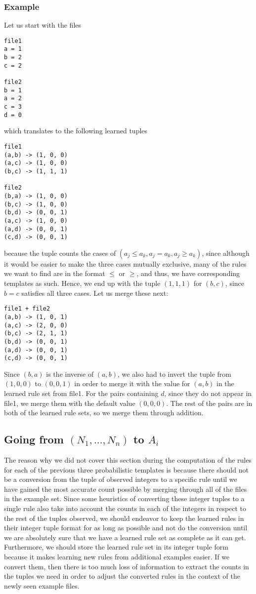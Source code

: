 \documentclass[12pt]{article}
\begin{document}
\subsubsection{Example}
Let us start with the files
\begin{lstlisting}
file1
a = 1
b = 2
c = 2

file2
b = 1
a = 2
c = 3
d = 0
\end{lstlisting}
which translates to the following learned tuples
\begin{lstlisting}
file1
(a,b) -> (1, 0, 0)
(a,c) -> (1, 0, 0)
(b,c) -> (1, 1, 1)

file2
(b,a) -> (1, 0, 0)
(b,c) -> (1, 0, 0)
(b,d) -> (0, 0, 1)
(a,c) -> (1, 0, 0)
(a,d) -> (0, 0, 1)
(c,d) -> (0, 0, 1)
\end{lstlisting}
because the tuple counts the cases of $(a_j \leq a_k, a_j = a_k, a_j \geq a_k)$, since although it would be easier to make the three cases mutually exclusive, many of the rules we want to find are in the format $\leq$ or $\geq$, and thus, we have corresponding templates as such. Hence, we end up with the tuple $(1, 1, 1)$ for $(b,c)$, since $b = c$ satisfies all three cases. Let us merge these next:
\begin{lstlisting}
file1 + file2
(a,b) -> (1, 0, 1)
(a,c) -> (2, 0, 0)
(b,c) -> (2, 1, 1)
(b,d) -> (0, 0, 1)
(a,d) -> (0, 0, 1)
(c,d) -> (0, 0, 1)
\end{lstlisting}
Since $(b,a)$ is the inverse of $(a,b)$, we also had to invert the tuple from $(1, 0, 0)$ to $(0, 0, 1)$ in order to merge it with the value for $(a,b)$ in the learned rule set from file1. For the pairs containing $d$, since they do not appear in file1, we merge them with the default value $(0, 0, 0)$. The rest of the pairs are in both of the learned rule sets, so we merge them through addition.

\subsection{Going from $(N_1, ... , N_n)$ to $A_i$}
The reason why we did not cover this section during the computation of the rules for each of the previous three probabilistic templates is because there should not be a conversion from the tuple of observed integers to a specific rule until we have gained the most accurate count possible by merging through all of the files in the example set. Since some heuristics of converting these integer tuples to a single rule also take into account the counts in each of the integers in respect to the rest of the tuples observed, we should endeavor to keep the learned rules in their integer tuple format for as long as possible and not do the conversion until we are absolutely sure that we have a learned rule set as complete as it can get. Furthermore, we should store the learned rule set in its integer tuple form because it makes learning new rules from additional examples easier. If we convert them, then there is too much loss of information to extract the counts in the tuples we need in order to adjust the converted rules in the context of the newly seen example files.
\end{document}
